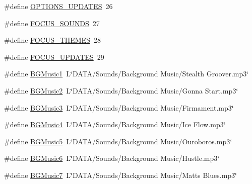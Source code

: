 \begin{DoxyCompactItemize}
\item 
\#define \hyperlink{_b_o_w-a_01film_01guessing_01game_8cpp_a109faa3294156ce4d291f9a72b584d79}{O\+P\+T\+I\+O\+N\+S\+\_\+\+U\+P\+D\+A\+T\+E\+S}~26
\item 
\#define \hyperlink{_b_o_w-a_01film_01guessing_01game_8cpp_ac69dbc130f2f432ad3ea0e1bb14d6e67}{F\+O\+C\+U\+S\+\_\+\+S\+O\+U\+N\+D\+S}~27
\item 
\#define \hyperlink{_b_o_w-a_01film_01guessing_01game_8cpp_a48398b45b3dc162e02ae7f263c7a4580}{F\+O\+C\+U\+S\+\_\+\+T\+H\+E\+M\+E\+S}~28
\item 
\#define \hyperlink{_b_o_w-a_01film_01guessing_01game_8cpp_af44de7d27f7272b71451e9eb3f942dce}{F\+O\+C\+U\+S\+\_\+\+U\+P\+D\+A\+T\+E\+S}~29
\item 
\#define \hyperlink{_b_o_w-a_01film_01guessing_01game_8cpp_a326907179945bd20ec3bbf3c44880151}{B\+G\+Music1}~L\char`\"{}D\+A\+T\+A/Sounds/Background Music/Stealth Groover.\+mp3\char`\"{}
\item 
\#define \hyperlink{_b_o_w-a_01film_01guessing_01game_8cpp_a7e4f5ce398c929d5f803303c5ecca704}{B\+G\+Music2}~L\char`\"{}D\+A\+T\+A/Sounds/Background Music/Gonna Start.\+mp3\char`\"{}
\item 
\#define \hyperlink{_b_o_w-a_01film_01guessing_01game_8cpp_ad71937906f191df89adc7eb7369b4a34}{B\+G\+Music3}~L\char`\"{}D\+A\+T\+A/Sounds/Background Music/Firmament.\+mp3\char`\"{}
\item 
\#define \hyperlink{_b_o_w-a_01film_01guessing_01game_8cpp_a075f81b2faca54b6a93b1bf9f49e33bb}{B\+G\+Music4}~L\char`\"{}D\+A\+T\+A/Sounds/Background Music/Ice Flow.\+mp3\char`\"{}
\item 
\#define \hyperlink{_b_o_w-a_01film_01guessing_01game_8cpp_aaec572860153cad71963667e40598c68}{B\+G\+Music5}~L\char`\"{}D\+A\+T\+A/Sounds/Background Music/Ouroboros.\+mp3\char`\"{}
\item 
\#define \hyperlink{_b_o_w-a_01film_01guessing_01game_8cpp_a6ef7ac6d245509521d483e136651598f}{B\+G\+Music6}~L\char`\"{}D\+A\+T\+A/Sounds/Background Music/Hustle.\+mp3\char`\"{}
\item 
\#define \hyperlink{_b_o_w-a_01film_01guessing_01game_8cpp_ab58467e454ef0d4d2917b9b9e88769d8}{B\+G\+Music7}~L\char`\"{}D\+A\+T\+A/Sounds/Background Music/Matts Blues.\+mp3\char`\"{}
\end{DoxyCompactItemize}
